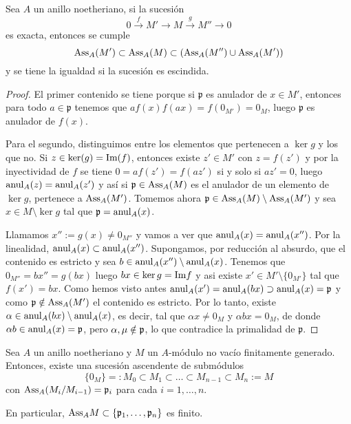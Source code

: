 \documentclass[../main.tex]{subfiles}
\begin{document}
\begin{lemma}\label{contenidos_assa}
Sea $A$ un anillo noetheriano, si la sucesión $$0\overset{f}{\longrightarrow} M'\longrightarrow M\overset{g}{\longrightarrow} M''\longrightarrow 0$$ es exacta, entonces se cumple $$\text{Ass}_A(M')\subset\text{Ass}_A(M)\subset\left (\text{Ass}_A(M'')\cup\text{Ass}_A(M')\right )$$ y se tiene la igualdad si la sucesión es escindida.
\end{lemma}\label{contenidos_assa}
\begin{proof}
El primer contenido se tiene porque si $\mathfrak{p}$ es anulador de $x \in M'$, entonces para todo $a \in \mathfrak{p}$ tenemos que $af(x)  f(ax) = f(0_{M'}) = 0_M$, luego $\mathfrak{p}$ es anulador de $f(x)$.

Para el segundo, distinguimos entre los elementos que pertenecen a $\ker g$ y los que no. Si $z\in\ker(g)= \text{Im}(f)$, entonces existe $z'\in M'$ con $z=f(z')$ y por la inyectividad de $f$ se tiene $0 = af(z') = f(az')$ si y solo si $az' = 0 $, luego $\operatorname{anul}_A(z)=\operatorname{anul}_A(z')$ y así si $\mathfrak{p}\in \text{Ass}_A(M)$ es el anulador de un elemento de $\ker g$, pertenece a $\text{Ass}_A(M')$. Tomemos ahora $\mathfrak{p}\in \text{Ass}_A(M) \setminus \text{Ass}_A(M') $ y sea $x\in M\setminus \ker g$ tal que $\mathfrak{p} = \operatorname{anul}_A(x)$.

Llamamos $x'':=g(x)\neq 0_{M''}$ y vamos a ver que $\operatorname{anul}_A(x)=\operatorname{anul}_A(x'')$. Por la linealidad, $\operatorname{anul}_A(x) \subset \operatorname{anul}_A(x'')$. Supongamos, por reducción al absurdo, que el contenido es estricto y sea $b \in\operatorname{anul}_A(x'')\setminus\operatorname{anul}_A(x)$. Tenemos que $0_{M''} = b x''=g(b x)$ luego $bx \in \ker g = \text{Im} f$ y asi existe $x'\in M'\setminus\{0_{M'}\}$ tal que $f(x')=b x$.
Como hemos visto antes $\operatorname{anul}_A(x')=\operatorname{anul}_A(b x)\supset\operatorname{anul}_A(x)=\mathfrak{p}$ y como $\mathfrak{p}\notin\text{Ass}_A(M')$ el contenido es estricto. Por lo tanto, existe $\alpha \in \operatorname{anul}_A(b x) \setminus\operatorname{anul}_A(x) $, es decir, tal que $\alpha x\neq 0_M$ y $\alpha b x=0_M$, de donde $\alpha b\in \operatorname{anul}_A(x) = \mathfrak{p}$, pero $\alpha,\mu\notin\mathfrak{p}$, lo que contradice la primalidad de $\mathfrak{p}$.
\end{proof}

\begin{proposition}\label{cadena_assa}
Sea $A$ un anillo noetheriano y $M$ un $A$-módulo no vacío finitamente generado. Entonces, existe una sucesión ascendente de submódulos $$\{0_M\}=:M_0\subset M_1\subset\dots\subset M_{n-1}\subset M_n:=M$$ con $\text{Ass}_A(M_i/M_{i-1})=\mathfrak{p}_i$ para cada $i=1,\dots,n$.

En particular, $\text{Ass}_AM\subset\{\mathfrak{p}_1,\dots,\mathfrak{p}_n\}$ es finito.
\end{proposition}
\end{document}
